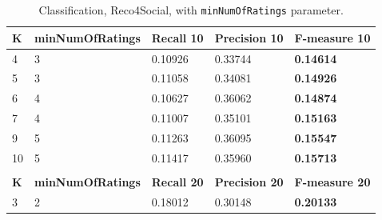 \documentclass[12pt]{report}
\begin{document}
\begin{table}[htpb]
\centering
\caption{Classification, Reco4Social, with \texttt{minNumOfRatings} parameter.}
\label{table.clas.reco2}
\vspace{3mm}
\begin{tabular}{lllll}
\hline
\multicolumn{1}{|l|}{{\bf K}} & \multicolumn{1}{l|}{{\bf minNumOfRatings}} & \multicolumn{1}{l|}{{\bf Recall 10}} & \multicolumn{1}{l|}{{\bf Precision 10}} & \multicolumn{1}{l|}{{\bf F-measure 10}} \\ \hline
\multicolumn{1}{|l|}{4}       & \multicolumn{1}{l|}{3}                        & \multicolumn{1}{l|}{0.10926}         & \multicolumn{1}{l|}{0.33744}            & \multicolumn{1}{l|}{{\bf 0.14614}}      \\ \hline
\multicolumn{1}{|l|}{5}       & \multicolumn{1}{l|}{3}                        & \multicolumn{1}{l|}{0.11058}         & \multicolumn{1}{l|}{0.34081}            & \multicolumn{1}{l|}{{\bf 0.14926}}      \\ \hline
\multicolumn{1}{|l|}{6}       & \multicolumn{1}{l|}{4}                        & \multicolumn{1}{l|}{0.10627}         & \multicolumn{1}{l|}{0.36062}            & \multicolumn{1}{l|}{{\bf 0.14874}}      \\ \hline
\multicolumn{1}{|l|}{7}       & \multicolumn{1}{l|}{4}                        & \multicolumn{1}{l|}{0.11007}         & \multicolumn{1}{l|}{0.35101}            & \multicolumn{1}{l|}{{\bf 0.15163}}      \\ \hline
\multicolumn{1}{|l|}{9}       & \multicolumn{1}{l|}{5}                        & \multicolumn{1}{l|}{0.11263}         & \multicolumn{1}{l|}{0.36095}            & \multicolumn{1}{l|}{{\bf 0.15547}}      \\ \hline
\multicolumn{1}{|l|}{10}      & \multicolumn{1}{l|}{5}                        & \multicolumn{1}{l|}{0.11417}         & \multicolumn{1}{l|}{0.35960}            & \multicolumn{1}{l|}{{\bf 0.15713}}      \\ \hline
                              &                                               &                                      &                                         &                                         \\ \hline
\multicolumn{1}{|l|}{{\bf K}} & \multicolumn{1}{l|}{{\bf minNumOfRatings}} & \multicolumn{1}{l|}{{\bf Recall 20}} & \multicolumn{1}{l|}{{\bf Precision 20}} & \multicolumn{1}{l|}{{\bf F-measure 20}} \\ \hline
\multicolumn{1}{|l|}{3}       & \multicolumn{1}{l|}{2}                        & \multicolumn{1}{l|}{0.18012}         & \multicolumn{1}{l|}{0.30148}            & \multicolumn{1}{l|}{{\bf 0.20133}}      \\ \hline

\end{tabular}
\end{table}
\end{document}
